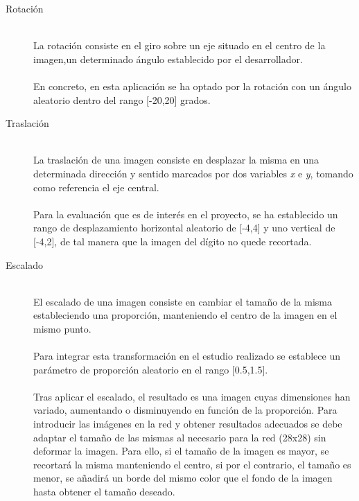 \begin{description}
	\item[Rotación] \hfill 
	\vspace{5pt}
	\\
	La rotación consiste en el giro sobre un eje situado en el centro de la imagen,un determinado ángulo establecido por el desarrollador.\\
	\vspace{-10pt}
	\\
	En concreto, en esta aplicación se ha optado por la rotación con un ángulo aleatorio dentro del rango [-20,20] grados.
	\vspace{10pt}
	\item[Traslación] \hfill 
	\vspace{5pt}
	\\
	La traslación de una imagen consiste en desplazar la misma en una determinada dirección y sentido marcados por dos variables \textit{x} e \textit{y}, tomando como referencia el eje central.\\
	\vspace{-10pt}
	\\
	Para la evaluación que es de interés en el proyecto, se ha establecido un rango de desplazamiento horizontal aleatorio de [-4,4] y uno vertical de [-4,2], de tal manera que la imagen del dígito no quede recortada.
	\vspace{10pt}
	\item[Escalado] \hfill 
	\vspace{5pt}
	\\
	El escalado de una imagen consiste en cambiar el tamaño de la misma estableciendo una proporción, manteniendo el centro de la imagen en el mismo punto.\\
	\vspace{-10pt}
	\\
	Para integrar esta transformación en el estudio realizado se establece un parámetro de proporción aleatorio en el rango [0.5,1.5].\\
	\vspace{-10pt}
	\\
	Tras aplicar el escalado, el resultado es una imagen cuyas dimensiones han variado, aumentando o disminuyendo en función de la proporción. Para introducir las imágenes en la red y obtener resultados adecuados se debe adaptar el tamaño de las mismas al necesario para la red (28x28) sin deformar la imagen. Para ello, si el tamaño de la imagen es mayor, se recortará la misma manteniendo el centro, si por el contrario, el tamaño es menor, se añadirá un borde del mismo color que el fondo de la imagen hasta obtener el tamaño deseado.

\end{description}

